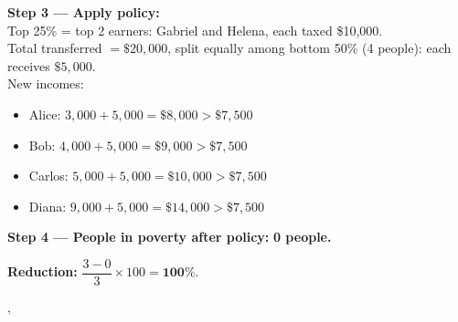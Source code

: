 {{    \textbf{Step 3 --- Apply policy:}\\
    Top 25\% = top 2 earners: Gabriel and Helena, each taxed \$10,000.\\
    Total transferred $= \$20{,}000$, split equally among bottom 50\% (4
    people): each receives $\$5{,}000$.\\
    New incomes:
    \begin{itemize}
      \item Alice: $3{,}000 + 5{,}000 = \$8{,}000 > \$7{,}500$ \\
      \item Bob: $4{,}000 + 5{,}000 = \$9{,}000 > \$7{,}500$ \\
      \item Carlos: $5{,}000 + 5{,}000 = \$10{,}000 > \$7{,}500$ \\
      \item Diana: $9{,}000 + 5{,}000 = \$14{,}000 > \$7{,}500$
    \end{itemize}

    \textbf{Step 4 --- People in poverty after policy:} \textbf{0 people.}

    \textbf{Reduction:} $\dfrac{3 - 0}{3} \times 100 = \mathbf{100\%}$.
  },
}
